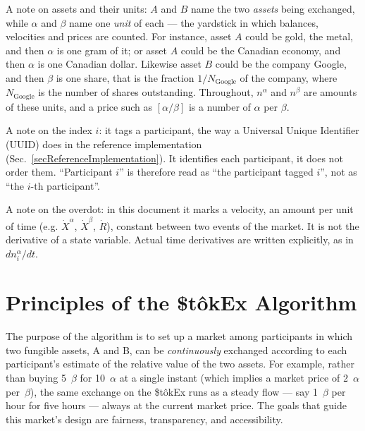 \documentclass[letterpaper]{article}
\newcommand{\priceAB}{\left[\alpha / \beta\right]}
\newcommand{\StokEx}{\$t\^{o}kEx}
\begin{document}
A note on assets and their units: $A$ and $B$ name the two \emph{assets} being exchanged, while $\alpha$ and $\beta$ name one \emph{unit} of each --- the yardstick in which balances, velocities and prices are counted. For instance, asset $A$ could be gold, the metal, and then $\alpha$ is one gram of it; or asset $A$ could be the Canadian economy, and then $\alpha$ is one Canadian dollar. Likewise asset $B$ could be the company Google, and then $\beta$ is one share, that is the fraction $1/N_{\mathrm{Google}}$ of the company, where $N_{\mathrm{Google}}$ is the number of shares outstanding. Throughout, $n^\alpha$ and $n^\beta$ are amounts of these units, and a price such as $\priceAB$ is a number of $\alpha$ per $\beta$.

A note on the index $i$: it tags a participant, the way a Universal Unique Identifier (UUID) does in the reference implementation (Sec.~\ref{secReferenceImplementation}). It identifies each participant, it does not order them. ``Participant $i$'' is therefore read as ``the participant tagged $i$'', not as ``the $i$-th participant''.

A note on the overdot: in this document it marks a velocity, an amount per unit of time (e.g. $\dot{X}^\alpha$, $\dot{X}^\beta$, $\dot{R}$), constant between two events of the market. It is not the derivative of a state variable. Actual time derivatives are written explicitly, as in $dn^\alpha_i/dt$.

\section{Principles of the \StokEx{} Algorithm}

The purpose of the algorithm is to set up a market among participants in which two fungible assets, A and B, can be \emph{continuously} exchanged according to each participant's estimate of the relative value of the two assets. For example, rather than buying 5~$\beta$ for 10~$\alpha$ at a single instant (which implies a market price of 2~$\alpha$ per~$\beta$), the same exchange on the \StokEx{} runs as a steady flow --- say 1~$\beta$ per hour for five hours --- always at the current market price. The goals that guide this market's design are fairness, transparency, and accessibility.
\end{document}
